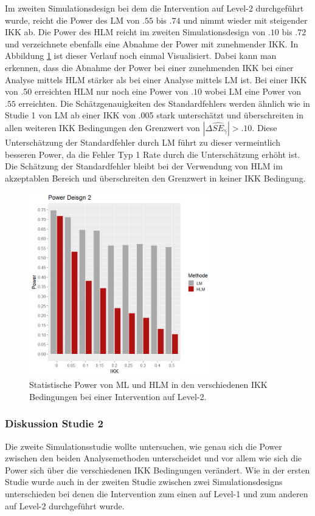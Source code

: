 \documentclass[12pt]{article}\usepackage[]{graphicx}\usepackage[]{color}
\begin{document}
Im zweiten Simulationsdesign bei dem die Intervention auf Level-2 durchgeführt wurde, reicht die Power des LM von $.55$ bis $.74$ und nimmt wieder mit steigender IKK ab. Die Power des HLM reicht im zweiten Simulationsdesign von $.10$ bis $.72$ und verzeichnete ebenfalls eine Abnahme der Power mit zunehmender IKK. In Abbildung \ref{fig:power_design2} ist dieser Verlauf noch einmal Visualisiert. Dabei kann man erkennen, dass die Abnahme der Power bei einer zunehmenden IKK bei einer Analyse mittels HLM stärker als bei einer Analyse mittels LM ist. Bei einer IKK von .50 erreichten HLM nur noch eine Power von $.10$ wobei LM eine Power von $.55$ erreichten. Die Schätzgenauigkeiten des Standardfehlers werden ähnlich wie in Studie 1 von LM ab einer IKK von .005 stark unterschätzt und überschreiten in allen weiteren IKK Bedingungen den Grenzwert von $|\Delta\widehat{SE}_{\widehat{\gamma}}| > .10$. Diese Unterschätzung der Standardfehler durch LM führt zu dieser vermeintlich besseren Power, da die Fehler Typ 1 Rate durch die Unterschätzung erhöht ist. Die Schätzung der Standardfehler bleibt bei der Verwendung von HLM im akzeptablen Bereich und überschreiten den Grenzwert in keiner IKK Bedingung. 
\begin{figure}[t!]
\centering
\captionsetup{width=8cm}
\includegraphics[width=8cm, height=8cm]{power_design2}
\caption{Statistische Power von ML und HLM in den verschiedenen IKK Bedingungen bei einer Intervention auf Level-2.}
\label{fig:power_design2}
\end{figure}

\subsubsection{Diskussion Studie 2}
Die zweite Simulationsstudie wollte untersuchen, wie genau sich die Power zwischen den beiden Analysemethoden unterscheidet und vor allem wie sich die Power sich über die verschiedenen IKK Bedingungen verändert. Wie in der ersten Studie wurde auch in der zweiten Studie zwischen zwei Simulationsdesigns unterschieden bei denen die Intervention zum einen auf Level-1 und zum anderen auf Level-2 durchgeführt wurde.
\end{document}
